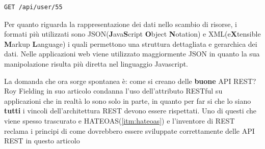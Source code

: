\begin{lstlisting}[caption={Identificazione di una risorsa all'interno di una architettura REST}, label={lst:correctRESTURL}]
	GET /api/user/55
\end{lstlisting}

Per quanto riguarda la rappresentazione dei dati nello scambio di risorse, i formati più utilizzati sono JSON(\textbf{J}ava\textbf{S}cript \textbf{O}bject \textbf{N}otation) e XML(e\textbf{X}tensible \textbf{M}arkup \textbf{L}anguage) i quali permettono una struttura dettagliata e gerarchica dei dati. Nelle applicazioni web viene utilizzato maggiormente JSON in quanto la sua manipolazione risulta più diretta nel linguaggio Javascript.

La domanda che ora sorge spontanea è: come si creano delle \textbf{buone} API REST? Roy Fielding in suo articolo condanna l'uso dell'attributo RESTful su applicazioni che in realtà lo sono solo in parte, in quanto per far si che lo siano \textbf{tutti} i vincoli dell'architettura REST devono essere rispettati.
Uno di questi che viene spesso trascurato e HATEOAS(\ref{itm:hateoas}) e l'inventore di REST reclama i principi di come dovrebbero essere sviluppate correttamente delle API REST in questo articolo \citep{web:restapi}

%
%
%
%
%
%

